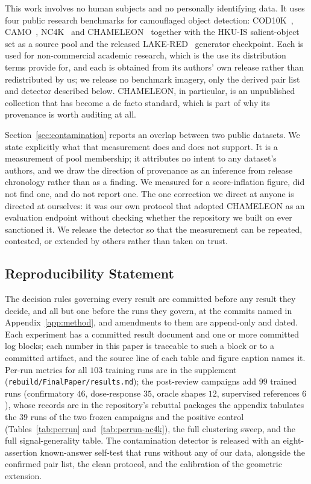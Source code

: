 \documentclass{article}
\newif\ifrevmarked \revmarkedtrue
\DeclareRobustCommand{\revB}[1]{\ifrevmarked{\color{RevB}#1}\else{#1}\fi}
\DeclareRobustCommand{\revShared}[1]{\ifrevmarked{\color{RevShared}#1}\else{#1}\fi}
\begin{document}
This work involves no human subjects and no personally identifying data. It uses four public
research benchmarks for camouflaged object detection: COD10K~\citep{fan2022concealed},
CAMO~\citep{le2019anabranch}, NC4K~\citep{lv2021simultaneously} and
CHAMELEON~\citep{skurowski2018animal} together with the HKU-IS salient-object set as a source
pool and the released LAKE-RED~\citep{zhao2024lakered} generator checkpoint. Each is used for
non-commercial academic research, which is the use its distribution terms provide for, and each is
obtained from its authors' own release rather than redistributed by us; we release no benchmark
imagery, only the derived pair list and detector described below. CHAMELEON, in particular, is an unpublished collection that has become a de facto standard, which is part of why its provenance is worth auditing at all.

Section~\ref{sec:contamination} reports an overlap between two public datasets. We state explicitly
what that measurement does and does not support. It is a measurement of pool membership; it attributes
no intent to any dataset's authors, and we draw the direction of provenance as an inference from
release chronology rather than as a finding. We measured for a score-inflation figure, did not find
one, and do not report one. The one correction we direct at anyone is directed at ourselves: it was
our own protocol that adopted CHAMELEON as an evaluation endpoint without checking whether the
repository we built on ever sanctioned it. We release the detector so that the measurement can be
repeated, contested, or extended by others rather than taken on trust.

\subsection*{Reproducibility Statement}

The decision rules governing every result are \revB{committed before any result they decide, and all but one before the runs they govern}, at the commits
named in Appendix~\ref{app:method}, and amendments to them are append-only and dated. Each experiment
has a committed result document and one or more committed log blocks; each number in this paper is
traceable to such a block or to a committed artifact, and the source line of each table and figure
caption names it. Per-run metrics for all $103$ training runs are in the supplement
(\texttt{rebuild/FinalPaper/results.md})\revShared{; the post-review campaigns add $99$ trained runs (confirmatory $46$,
dose-response $35$, oracle shapes $12$, supervised references $6$), whose records are in the repository's rebuttal
packages} the appendix tabulates the $39$ runs of the two frozen
campaigns and the positive control (Tables~\ref{tab:perrun} and~\ref{tab:perrun-nc4k}), the full
clustering sweep, and the full signal-generality table. The contamination detector is released with an
eight-assertion known-answer self-test that runs without any of our data, alongside the confirmed
pair list, the clean protocol, and the calibration of the geometric extension.
\end{document}
